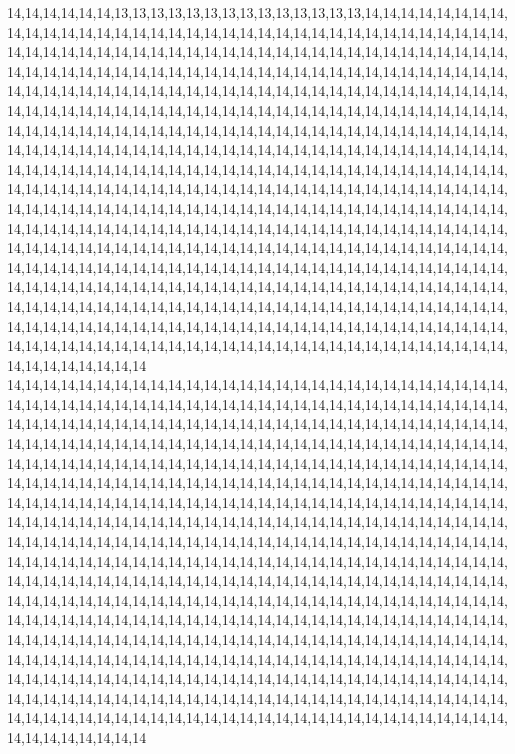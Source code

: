 14,14,14,14,14,14,13,13,13,13,13,13,13,13,13,13,13,13,13,13,14,14,14,14,14,14,14,14,14,14,14,14,14,14,14,14,14,14,14,14,14,14,14,14,14,14,14,14,14,14,14,14,14,14,14,14,14,14,14,14,14,14,14,14,14,14,14,14,14,14,14,14,14,14,14,14,14,14,14,14,14,14,14,14,14,14,14,14,14,14,14,14,14,14,14,14,14,14,14,14,14,14,14,14,14,14,14,14,14,14,14,14,14,14,14,14,14,14,14,14,14,14,14,14,14,14,14,14,14,14,14,14,14,14,14,14,14,14,14,14,14,14,14,14,14,14,14,14,14,14,14,14,14,14,14,14,14,14,14,14,14,14,14,14,14,14,14,14,14,14,14,14,14,14,14,14,14,14,14,14,14,14,14,14,14,14,14,14,14,14,14,14,14,14,14,14,14,14,14,14,14,14,14,14,14,14,14,14,14,14,14,14,14,14,14,14,14,14,14,14,14,14,14,14,14,14,14,14,14,14,14,14,14,14,14,14,14,14,14,14,14,14,14,14,14,14,14,14,14,14,14,14,14,14,14,14,14,14,14,14,14,14,14,14,14,14,14,14,14,14,14,14,14,14,14,14,14,14,14,14,14,14,14,14,14,14,14,14,14,14,14,14,14,14,14,14,14,14,14,14,14,14,14,14,14,14,14,14,14,14,14,14,14,14,14,14,14,14,14,14,14,14,14,14,14,14,14,14,14,14,14,14,14,14,14,14,14,14,14,14,14,14,14,14,14,14,14,14,14,14,14,14,14,14,14,14,14,14,14,14,14,14,14,14,14,14,14,14,14,14,14,14,14,14,14,14,14,14,14,14,14,14,14,14,14,14,14,14,14,14,14,14,14,14,14,14,14,14,14,14,14,14,14,14,14,14,14,14,14,14,14,14,14,14,14,14,14,14,14,14,14,14,14,14,14,14,14,14,14,14,14,14,14,14,14,14,14,14,14,14,14,14,14,14,14,14,14,14,14,14,14,14,14,14,14,14,14,14,14,14,14,14,14,14,14,14,14,14,14,14,14,14,14,14,14,14,14,14,14,14,14,14,14,14,14,14,14,14,14,14,14,14,14,14,14,14,14,14,14,14,14,14,14,14,14,14,14,14,14,14,14,14
14,14,14,14,14,14,14,14,14,14,14,14,14,14,14,14,14,14,14,14,14,14,14,14,14,14,14,14,14,14,14,14,14,14,14,14,14,14,14,14,14,14,14,14,14,14,14,14,14,14,14,14,14,14,14,14,14,14,14,14,14,14,14,14,14,14,14,14,14,14,14,14,14,14,14,14,14,14,14,14,14,14,14,14,14,14,14,14,14,14,14,14,14,14,14,14,14,14,14,14,14,14,14,14,14,14,14,14,14,14,14,14,14,14,14,14,14,14,14,14,14,14,14,14,14,14,14,14,14,14,14,14,14,14,14,14,14,14,14,14,14,14,14,14,14,14,14,14,14,14,14,14,14,14,14,14,14,14,14,14,14,14,14,14,14,14,14,14,14,14,14,14,14,14,14,14,14,14,14,14,14,14,14,14,14,14,14,14,14,14,14,14,14,14,14,14,14,14,14,14,14,14,14,14,14,14,14,14,14,14,14,14,14,14,14,14,14,14,14,14,14,14,14,14,14,14,14,14,14,14,14,14,14,14,14,14,14,14,14,14,14,14,14,14,14,14,14,14,14,14,14,14,14,14,14,14,14,14,14,14,14,14,14,14,14,14,14,14,14,14,14,14,14,14,14,14,14,14,14,14,14,14,14,14,14,14,14,14,14,14,14,14,14,14,14,14,14,14,14,14,14,14,14,14,14,14,14,14,14,14,14,14,14,14,14,14,14,14,14,14,14,14,14,14,14,14,14,14,14,14,14,14,14,14,14,14,14,14,14,14,14,14,14,14,14,14,14,14,14,14,14,14,14,14,14,14,14,14,14,14,14,14,14,14,14,14,14,14,14,14,14,14,14,14,14,14,14,14,14,14,14,14,14,14,14,14,14,14,14,14,14,14,14,14,14,14,14,14,14,14,14,14,14,14,14,14,14,14,14,14,14,14,14,14,14,14,14,14,14,14,14,14,14,14,14,14,14,14,14,14,14,14,14,14,14,14,14,14,14,14,14,14,14,14,14,14,14,14,14,14,14,14,14,14,14,14,14,14,14,14,14,14,14,14,14,14,14,14,14,14,14,14,14,14,14,14,14,14,14,14,14,14,14,14,14,14,14,14,14,14,14,14,14,14,14,14,14,14,14,14,14,14,14,14,14,14,14,14,14,14,14,14
